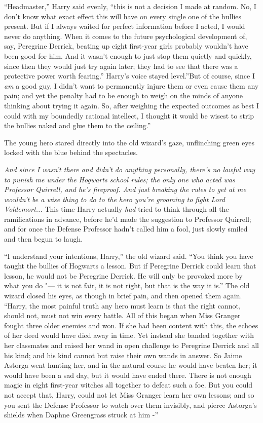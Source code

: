 ``Headmaster,'' Harry said evenly, ``this is not a decision I made at
random. No, I don't know what exact effect this will have on every
single one of the bullies present. But if I always waited for perfect
information before I acted, I would never do anything. When it comes to
the future psychological development of, say, Peregrine Derrick, beating
up eight first-year girls probably wouldn't have been good for him. And
it wasn't enough to just stop them quietly and quickly, since then they
would just try again later; they had to see that there was a protective
power worth fearing.'' Harry's voice stayed level.''But of course, since
I \emph{am} a good guy, I didn't want to permanently injure them or even
cause them any pain; and yet the penalty had to be enough to weigh on
the minds of anyone thinking about trying it again. So, after weighing
the expected outcomes as best I could with my boundedly rational
intellect, I thought it would be wisest to strip the bullies naked and
glue them to the ceiling.''

The young hero stared directly into the old wizard's gaze, unflinching
green eyes locked with the blue behind the spectacles.

\emph{And since I wasn't there and didn't do anything personally,
there's no lawful way to punish me under the Hogwarts school rules; the
only one who acted was Professor Quirrell, and he's fireproof. And just
breaking the rules to get at me wouldn't be a wise thing to do to the
hero you're grooming to fight Lord Voldemort...} This time Harry
actually \emph{had} tried to think through all the ramifications in
advance, before he'd made the suggestion to Professor Quirrell; and for
once the Defense Professor hadn't called him a fool, just slowly smiled
and then begun to laugh.

``I understand your intentions, Harry,'' the old wizard said. ``You
think you have taught the bullies of Hogwarts a lesson. But if Peregrine
Derrick could learn that lesson, he would not be Peregrine Derrick. He
will only be provoked more by what you do "--- it is not fair, it is not
right, but that is the way it is.'' The old wizard closed his eyes, as
though in brief pain, and then opened them again. ``Harry, the most
painful truth any hero must learn is that the right cannot, should not,
must not win every battle. All of this began when Miss Granger fought
three older enemies and won. If she had been content with this, the
echoes of her deed would have died away in time. Yet instead she banded
together with her classmates and raised her wand in open challenge to
Peregrine Derrick and all his kind; and his kind cannot but raise their
own wands in answer. So Jaime Astorga went hunting her, and in the
natural course he would have beaten her; it would have been a sad day,
but it would have ended there. There is not enough magic in eight
first-year witches all together to defeat such a foe. But you could not
accept that, Harry, could not let Miss Granger learn her own lessons;
and so you sent the Defense Professor to watch over them invisibly, and
pierce Astorga's shields when Daphne Greengrass struck at him -''

